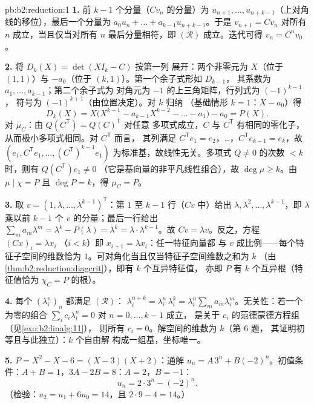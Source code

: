 \begin{solution}{pb:b2:reduction:1}
\textbf{1.} 前 $k - 1$ 个分量（$Cv_n$ 的分量）为 $u_{n+1},
\dots, u_{n+k-1}$（上对角线的移位），最后一个分量为
$a_0 u_n + \dots + a_{k-1}u_{n+k-1}$。于是 $v_{n+1} = Cv_n$ 对所有
$n$ 成立，当且仅当对所有 $n$ 最后分量相符，即
$(\mathcal R)$ 成立。迭代可得 $v_n = C^nv_0$。

\textbf{2.} 将 $D_k(X) = \det(XI_k - C)$ 按第一列
展开：两个非零元为 $X$（位于 $(1,1)$）与
$-a_0$（位于 $(k,1)$）。第一个余子式形如 $D_{k-1}$，
其系数为 $a_1, \dots, a_{k-1}$；第二个余子式为
对角元为 $-1$ 的上三角矩阵，行列式为 $(-1)^{k-1}$，
符号为 $(-1)^{k+1}$（由位置决定）。对 $k$ 归纳
（基础情形 $k = 1$：$X - a_0$）得
\[
D_k(X) = X\bigl(X^{k-1} - a_{k-1}X^{k-2} - \dots - a_1\bigr) -
a_0 = P(X).
\]
对 $\mu_C$：由 $Q(C^{\mathsf T}) = Q(C)^{\mathsf T}$ 对任意
多项式成立，$C$ 与 $C^{\mathsf T}$ 有相同的零化子，
从而极小多项式相同。对 $C^{\mathsf T}$ 而言，
其列满足 $C^{\mathsf T}e_1 = e_2$，\dots，$C^{\mathsf
T}e_{k-1} = e_k$，故 $(e_1, C^{\mathsf T}e_1, \dots, (C^{\mathsf
T})^{k-1}e_1)$ 为标准基，故线性无关。多项式 $Q
\neq 0$ 的次数 $< k$ 时，则有 $Q(C^{\mathsf T})e_1 \neq 0$
（它是基向量的非平凡线性组合），故 $\deg\mu \geq
k$。由 $\mu \mid \chi = P$ 且 $\deg P = k$，得 $\mu_C = P$。

\textbf{3.} 取 $v = (1, \lambda, \dots, \lambda^{k-1})^{\mathsf
T}$：第 $1$ 至 $k-1$ 行（$Cv$ 中）给出 $\lambda, \lambda^2, \dots,
\lambda^{k-1}$，即 $\lambda$ 乘以前 $k - 1$ 个
$v$ 的分量；最后一行给出 $\sum_m a_m\lambda^m = \lambda^k -
P(\lambda) = \lambda^k = \lambda\cdot\lambda^{k-1}$。故 $Cv =
\lambda v$。反之，方程 $(Cx)_i = \lambda x_i$
（$i < k$）即 $x_{i+1} = \lambda x_i$：任一特征向量都
与 $v$ 成比例——每个特征子空间的维数恰为
$1$。可对角化当且仅当特征子空间维数之和为 $k$
（由\cref{thm:b2:reduction:diagcrit}），即有 $k$ 个互异特征值，
亦即 $P$ 有 $k$ 个互异根（特征值恰为
$\chi_C = P$ 的根）。

\textbf{4.} 每个 $(\lambda_i^n)_n$ 都满足 $(\mathcal R)$：
$\lambda_i^{n+k} = \lambda_i^n\,\lambda_i^k =
\lambda_i^n\sum_m a_m\lambda_i^m$。无关性：若一个
为零的组合 $\sum_i c_i\lambda_i^n = 0$ 对 $n = 0, \dots, k-1$ 成立，
是关于 $c_i$ 的范德蒙德方程组（见\cref{exo:b2:linalg:11}），
则所有 $c_i = 0$。解空间的维数为 $k$（第 6 题，
其证明初等且与此独立）：$k$ 个自由解
构成一组基，坐标唯一。

\textbf{5.} $P = X^2 - X - 6 = (X - 3)(X + 2)$：通解
$u_n = A\,3^n + B(-2)^n$。初值条件：$A + B = 1$，$3A -
2B = 8$：$A = 2$，$B = -1$：
\[
u_n = 2\cdot 3^n - (-2)^n .
\]
（检验：$u_2 = u_1 + 6u_0 = 14$，且 $2\cdot9 - 4 = 14$。）


\end{solution}
